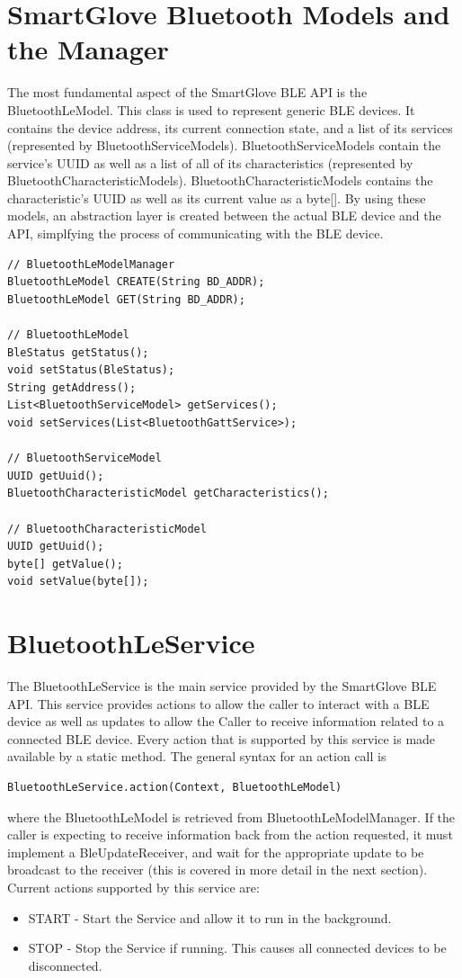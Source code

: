 \documentclass{scrreprt}
\begin{document}
\section{SmartGlove Bluetooth Models and the Manager}
The most fundamental aspect of the SmartGlove BLE API is the BluetoothLeModel. This class is
used to represent generic BLE devices. It contains the device address, its current connection
state, and a list of its services (represented by BluetoothServiceModels). BluetoothServiceModels
contain the service's UUID as well as a list of all of its characteristics (represented by
BluetoothCharacteristicModels). BluetoothCharacteristicModels contains the characteristic's
UUID as well as its current value as a byte[]. By using these models, an abstraction layer is created
between the actual BLE device and the API, simplfying the process of communicating with the 
BLE device.
\begin{lstlisting}
// BluetoothLeModelManager
BluetoothLeModel CREATE(String BD_ADDR);
BluetoothLeModel GET(String BD_ADDR);

// BluetoothLeModel
BleStatus getStatus();
void setStatus(BleStatus);
String getAddress();
List<BluetoothServiceModel> getServices();
void setServices(List<BluetoothGattService>);

// BluetoothServiceModel
UUID getUuid();
BluetoothCharacteristicModel getCharacteristics();

// BluetoothCharacteristicModel
UUID getUuid();
byte[] getValue();
void setValue(byte[]);
\end{lstlisting}

\section{BluetoothLeService}
The BluetoothLeService is the main service provided by the SmartGlove
BLE API. This service provides actions to allow the caller to interact with
a BLE device as well as updates to allow the Caller to receive information
related to a connected BLE device. Every action that is supported by this
service is made available by a static method. The general syntax for
an action call is \begin{verbatim}BluetoothLeService.action(Context, BluetoothLeModel)\end{verbatim}
where the BluetoothLeModel is retrieved from BluetoothLeModelManager.
If the caller is expecting to receive information back from the action requested,
it must implement a BleUpdateReceiver, and wait for the appropriate update
to be broadcast to the receiver (this is covered in more detail in the next section).
Current actions supported by this service are:\\
\begin{itemize}
	\item{START - Start the Service and allow it to run in the background.}
	\item{STOP - Stop the Service if running. This causes all connected devices
	to be disconnected.}
\end{itemize}
\end{document}

